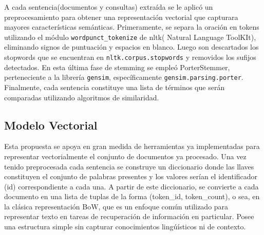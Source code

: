 \documentclass{llncs}
\begin{document}
A cada sentencia(documentos y consultas) extraída se le aplicó un preprocesamiento para obtener una representación vectorial que capturara mayores características semánticas. Primeramente, se separa la oración en tokens utilizando el módulo \texttt{wordpunct\_tokenize} de nltk( Natural Language ToolKIt), eliminando signos de puntuación y espacios en blanco. Luego son descartados los stopwords que se encuentran en \texttt{nltk.corpus.stopwords} y removidos los sufijos detectados. En esta última fase de stemming se empleó PorterStemmer, perteneciente a la librería \texttt{gensim}, específicamente \texttt{gensim.parsing.porter}. Finalmente, cada sentencia constituye una lista de términos que serán comparadas utilizando algoritmos de similaridad.

\subsection{Modelo Vectorial}

Esta propuesta se apoya en gran medida de herramientas ya implementadas para representar vectorialmente el conjunto de documentos ya procesado. Una vez tenido preprocesada cada sentencia se construye un diccionario donde las llaves constituyen el conjunto de palabras presentes y los valores serían el identificador (id) correspondiente a cada una. A partir de este diccionario, se convierte a cada documento en una lista de tuplas de la forma (token\_id, token\_count), o sea, en la clásica representación BoW, que es un enfoque común utilizado para representar texto en tareas de recuperación de información en particular. Posee una estructura simple sin capturar conocimientos lingúísticos ni de contexto.
\end{document}
